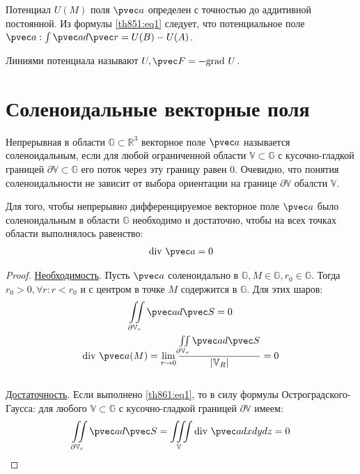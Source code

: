 \begin{remark}
  Потенциал $U(M)$ поля $\pvec a$ определен с точностью до аддитивной
  постоянной. Из формулы \eqref{th851:eq1} следует, что потенциальное поле
  $\pvec a: \int \pvec a d \pvec r = U(B) - U(A)$.
\end{remark}

\begin{remark}
  Линиями потенциала называют $U, \pvec F = -\mbox{grad} \ U$.
\end{remark}

\section{Соленоидальные векторные поля}
\begin{definition}
  Непрерывная в области $\mathbb{G} \subset \mathbb{R}^3$ векторное поле $\pvec
  a$ называется соленоидальным, если для любой ограниченной области $\mathbb{V}
  \subset \mathbb{G}$ с кусочно-гладкой границей $\partial \mathbb{V} \subset
  \mathbb{G}$ его поток через эту границу равен 0.
  Очевидно, что понятия соленоидальности не зависит от выбора ориентации на
  границе $\partial \mathbb{V}$ обалсти $\mathbb{V}$.
\end{definition}

\begin{theorem}
  Для того, чтобы непрерывно дифференцируемое векторное поле $\pvec a$ было
  соленоидальным в области $\mathbb{G}$ необходимо и достаточно, чтобы на всех
  точках области выполнялось равенство:
  \begin{gather}
    \mbox{div} \ \pvec a = 0
    \label{th861:eq1}
  \end{gather}
\end{theorem}

\begin{proof}
  \underline{Необходимость}. Пусть $\pvec a$ соленоидально в $\mathbb{G}, M \in
  \mathbb{G}, r_0 \in \mathbb{G}$. Тогда $r_0 > 0, \forall r : r < r_0$ и с
  центром в точке $M$ содержится в $\mathbb{G}$. Для этих шаров:
  \begin{gather*}
    \iint\limits_{\partial \mathbb{V}_r} \pvec a d \pvec S = 0 \\
    \mbox{div} \ \pvec a(M) = \lim\limits_{r \to 0}
    \frac{\iint\limits_{\partial \mathbb{V}_r} \pvec a d \pvec
    S}{|\mathbb{V}_R|} = 0
  \end{gather*} \\

  \underline{Достаточность}. Если выполнено \eqref{th861:eq1}, то в силу
  формулы Остроградского-Гаусса: для любого $\mathbb{V} \subset \mathbb{G}$ с
  кусочно-гладкой границей $\partial \mathbb{V}$ имеем:
  \begin{gather*}
    \iint\limits_{\partial \mathbb{V}_r} \pvec a d \pvec S =
    \iiint\limits_{\mathbb{V}} \mbox{div} \ \pvec a dx dy dz = 0
  \end{gather*}
\end{proof}

